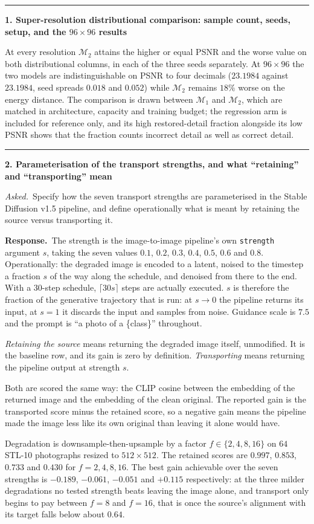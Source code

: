 \documentclass[11pt]{article}
\newcommand{\M}{\mathcal M}
\newenvironment{item12}[1]{%
  \par\medskip\noindent\rule{\textwidth}{0.7pt}\par\nobreak\smallskip
  \noindent\textbf{\large #1}\par\nobreak\smallskip
}{\par\medskip}
\newcommand{\ask}[1]{\noindent\emph{Asked.}\ #1\par\smallskip}
\newcommand{\resp}{\noindent\textbf{Response.}\ }
\begin{document}
\begin{item12}{1. Super-resolution distributional comparison: sample count, seeds, setup, and
the $96\times96$ results}
At every resolution $\M_2$ attains the higher or equal PSNR and the worse value on both
distributional columns, in each of the three seeds separately. At $96\times96$ the two models are
indistinguishable on PSNR to four decimals ($23.1984$ against $23.1984$, seed spreads $0.018$ and
$0.052$) while $\M_2$ remains $18\%$ worse on the energy distance. The comparison is drawn
between $\M_1$ and $\M_2$, which are matched in architecture, capacity and training budget; the
regression arm is included for reference only, and its high restored-detail fraction alongside
its low PSNR shows that the fraction counts incorrect detail as well as correct detail.
\end{item12}

\begin{item12}{2. Parameterisation of the transport strengths, and what ``retaining'' and
``transporting'' mean}
\ask{Specify how the seven transport strengths are parameterised in the Stable Diffusion v1.5
pipeline, and define operationally what is meant by retaining the source versus transporting it.}

\resp The strength is the image-to-image pipeline's own \texttt{strength} argument $s$, taking
the seven values $0.1$, $0.2$, $0.3$, $0.4$, $0.5$, $0.6$ and $0.8$. Operationally: the degraded
image is encoded to a latent,
noised to the timestep a fraction $s$ of the way along the schedule, and denoised from there to
the end. With a $30$-step schedule, $\lceil 30 s\rceil$ steps are actually executed. $s$ is
therefore the fraction of the generative trajectory that is run: at $s\to0$ the pipeline returns
its input, at $s=1$ it discards the input and samples from noise. Guidance scale is $7.5$ and the
prompt is ``a photo of a \{class\}'' throughout.

\emph{Retaining the source} means returning the degraded image itself, unmodified. It is the
baseline row, and its gain is zero by definition.
\emph{Transporting} means returning the pipeline output at strength $s$.

Both are scored the same way: the CLIP cosine between the embedding of the returned image and the
embedding of the clean original. The reported gain is the transported score minus the retained
score, so a negative gain means the pipeline made the image less like its own original than
leaving it alone would have.

Degradation is downsample-then-upsample by a factor $f\in\{2,4,8,16\}$ on $64$ STL-10 photographs
resized to $512\times512$. The retained scores are $0.997$, $0.853$, $0.733$ and $0.430$ for
$f=2,4,8,16$. The best gain achievable over the seven strengths is $-0.189$, $-0.061$, $-0.051$
and $+0.115$ respectively: at the three milder degradations no tested strength beats leaving the
image alone, and transport only begins to pay between $f=8$ and $f=16$, that is once the source's
alignment with its target falls below about $0.64$.


\end{item12}
\end{document}
